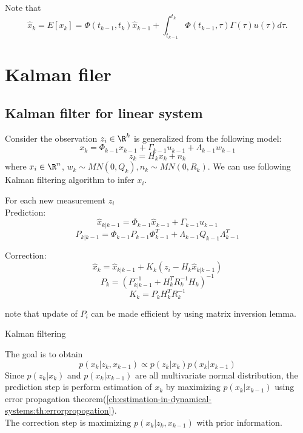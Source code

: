 \begin{refsection}
\begin{lemma}
Note that 
$$\hat{x}_k = E[x_{k}] = \Phi(t_{k-1},t_k)\hat{x}_{k-1} + \int_{t_{k-1}}^{t_{k} }\Phi(t_{k-1},\tau)\Gamma(\tau)u(\tau) d\tau.$$
\end{lemma}



\section{Kalman filer}
\subsection{Kalman filter for linear system}
Consider the observation $z_i \in \R^k$ is generalized from the following model:
$$x_{k} = \Phi_{k-1} x_{k-1} + \Gamma_{k-1}u_{k-1} + \Lambda_{k-1}w_{k-1}$$
$$z_k = H_kx_k + n_k$$
where $x_i\in \R^n$, $w_k\sim MN(0,Q_k),n_k\sim MN(0,R_k)$. We can use following Kalman filtering algorithm to infer $x_i$.\cite[342]{stengel2012optimal}

\begin{algorithm}[H]
	\SetAlgoLined
	For each new measurement $z_i$\\
	Prediction:
	$$\hat{x}_{k|k-1} = \Phi_{k-1}\hat{x}_{k-1} + \Gamma_{k-1}u_{k-1}$$
	$$P_{k|k-1} = \Phi_{k-1}P_{k-1}\Phi_{k-1}^T + \Lambda_{k-1}Q_{k-1}\Lambda_{k-1}^T$$
	
	Correction:
	$$\hat{x}_k = \hat{x}_{k|k-1} + K_k(z_i - H_k \hat{x}_{k|k-1})$$
	$$P_k = (P_{k|k-1}^{-1} + H_k^TR_k^{-1}H_k)^{-1}$$
	$$K_k = P_kH_k^TR_k^{-1}$$


	note that update of $P_i$ can be made efficient by using matrix inversion lemma.
	
	\caption{Kalman filtering}
\end{algorithm}


\begin{remark}
	The goal is to obtain 
	$$p(x_k|z_k,x_{k-1}) \propto p(z_k|x_k) p(x_k|x_{k-1})$$
	Since $p(z_k|x_k)$ and $p(x_k|x_{k-1})$ are all multivariate normal distribution, the prediction step is perform estimation of $x_k$ by maximizing $p(x_k|x_{k-1})$ using error propagation theorem(\autoref{ch:estimation-in-dynamical-systems:th:errorpropogation}).\\ 
	The correction step is maximizing $p(x_k|z_k,x_{k-1})$ with prior information. 
\end{remark}


\end{refsection}
